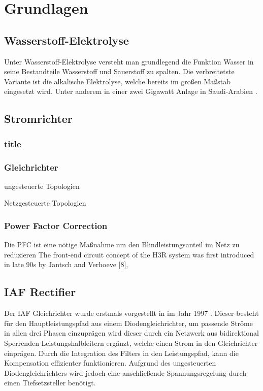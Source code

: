 \chapter{Grundlagen}


\section{Wasserstoff-Elektrolyse}
Unter Wasserstoff-Elektrolyse versteht man grundlegend die Funktion Wasser in seine Bestandteile Wasserstoff und Sauerstoff zu spalten. Die verbreitetste Variante ist die alkalische Elektrolyse, welche bereits im großen Maßstab eingesetzt wird. Unter anderem in einer zwei Gigawatt Anlage in Saudi-Arabien \cite{2GWely}.

\section{Stromrichter}
\subsection{title}
\subsection{Gleichrichter}

	ungesteuerte Topologien
	
	Netzgesteuerte Topologien
	
\subsection{Power Factor Correction}
	Die \gls{PFC} ist eine nötige Maßnahme um den Blindleistungsanteil im Netz zu reduzieren 
	The front-end circuit concept of the H3R system was first introduced in late 90s by Jantsch and Verhoeve [8],
	
	
\section{IAF Rectifier}
Der \gls{IAF} Gleichrichter wurde erstmals vorgestellt in \cite{IAFfirst} im Jahr 1997 . Dieser besteht für den Hauptleistungspfad aus einem Diodengleichrichter, um passende Ströme in allen drei Phasen einzuprägen wird dieser durch ein Netzwerk aus bidirektional Sperrenden Leistungshalbleitern ergänzt, welche einen Strom in den Gleichrichter einprägen. Durch die Integration des Filters in den Leistungspfad, kann die Kompensation effizienter funktionieren. Aufgrund des ungesteuerten Diodengleichrichters wird jedoch eine anschließende Spannungsregelung durch einen Tiefsetzsteller benötigt.

